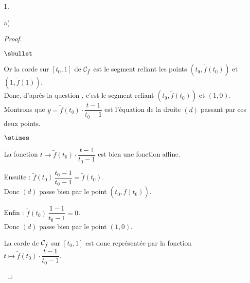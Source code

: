 \begin{noliste}{1.}
\begin{noliste}{a)}
\begin{proof}
\begin{noliste}{$\sbullet$}
      \item Or la corde sur $[t_0,1]$ de ${\cal C}_{\tilde{f}}$ est le 
      segment 
      reliant les points $(t_0,\tilde{f}(t_0))$ et $(1,\tilde{f}(1))$.\\
      Donc, d'après la question , c'est le segment reliant 
      $(t_0,\tilde{f}(t_0))$ et $(1,0)$.\\
      Montrons que $y= \tilde{f}(t_0) \cdot \dfrac{t-1}{t_0-1}$ est 
      l'équation de la droite $(d)$ passant par ces deux points.
      \begin{noliste}{$\stimes$}
        \item La fonction $t\mapsto \tilde{f}(t_0) \cdot 
	\dfrac{t-1}{t_0-1}$ est bien une fonction affine.
        \item Ensuite : $\tilde{f}(t_0) \, \dfrac{t_0-1}{t_0-1} = 
        \tilde{f}(t_0)$.\\[.1cm]
        Donc $(d)$ passe bien 
        par le point $(t_0,\tilde{f}(t_0))$.
        \item Enfin : $\tilde{f}(t_0) \, \dfrac{1-1}{t_0-1} = 
	0$.\\[.1cm]
        Donc $(d)$ 
        passe bien par le point $(1,0)$.
      \end{noliste}
      La corde de ${\cal C}_{\tilde{f}}$ sur $[t_0,1]$ est donc 
      représentée par la fonction $t \mapsto \tilde{f}(t_0) \cdot
      \dfrac{t-1}{t_0-1}$.
% 
%       
%       
%       
%       
%       
%       

\end{noliste}
\end{proof}
\end{noliste}
\end{noliste}
